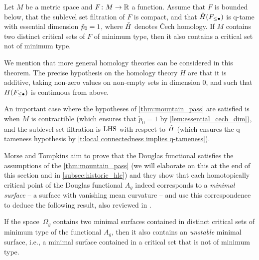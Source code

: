 \begin{thm}
\label{thm:mountain_pass}
	Let $M$ be a metric space and $F \colon M \to \mathbb{R}$ a function.
	Assume that $F$ is bounded below, that the sublevel set filtration of $F$ is compact, and that $\check{H}(F_{\leq \bullet})$ is q-tame with essential dimension $\check{p}_{0} = 1$, where $\check{H}$ denotes \v{C}ech homology.
	If $M$ contains two distinct critical sets of $F$ of minimum type, then it also contains a critical set not of minimum type.
\end{thm}

\begin{rem}
	We mention that more general homology theories can be considered in this theorem.
	The precise hypothesis on the homology theory $H$ are that it is additive, taking non-zero values on non-empty sets in dimension $0$, and such that $H(F_{\leq \bullet})$ is continuous from above.
\end{rem}

An important case where the hypotheses of \cref{thm:mountain_pass} are satisfied is when $M$ is contractible (which ensures that $\check{p}_0 = 1$ by \cref{lem:essential_cech_dim}), and the sublevel set filtration is $\mathrm{LHS}$ with respect to $\check{H}$ (which ensures the q-tameness hypothesis by \cref{t:local connectedness implies q-tameness}).

Morse and Tompkins aim to prove that the Douglas functional satisfies the assumptions of the \cref{thm:mountain_pass} (we will elaborate on this at the end of this section and in \cref{subsec:historic_hlc}) and they show \cite[Theorem 6.2]{Morse.1939} that each homotopically critical point of the Douglas functional $A_g$ indeed corresponds to
%
a \emph{minimal surface} -- a surface with vanishing mean curvature -- and use this correspondence to deduce the following result, also reviewed in \cite[Theorem II.6.10]{Struwe.1988}.

\begin{cor}
\label{thm:unstable_minimial_surface}
	If the space~$\Omega_g$ contains two minimal surfaces contained in distinct critical sets of minimum type of the functional $A_g$, then it also contains an \emph{unstable} minimal surface, i.e., a minimal surface contained in a critical set that is not of minimum type.
\end{cor}

